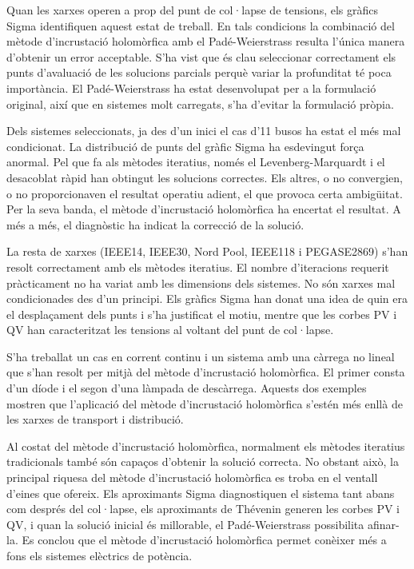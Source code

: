Quan les xarxes operen a prop del punt de col·lapse de tensions, els gràfics Sigma identifiquen aquest estat de treball. En tals condicions la combinació del mètode d'incrustació holomòrfica amb el Padé-Weierstrass resulta l'única manera d'obtenir un error acceptable. S'ha vist que és clau seleccionar correctament els punts d'avaluació de les solucions parcials perquè variar la profunditat té poca importància. El Padé-Weierstrass ha estat desenvolupat per a la formulació original, així que en sistemes molt carregats, s'ha d'evitar la formulació pròpia. 

Dels sistemes seleccionats, ja des d'un inici el cas d'11 busos ha estat el més mal condicionat. La distribució de punts del gràfic Sigma ha esdevingut força anormal. Pel que fa als mètodes iteratius, només el Levenberg-Marquardt i el desacoblat ràpid han obtingut les solucions correctes. Els altres, o no convergien, o no proporcionaven el resultat operatiu adient, el que provoca certa ambigüitat. Per la seva banda, el mètode d'incrustació holomòrfica ha encertat el resultat. A més a més, el diagnòstic ha indicat la correcció de la solució.

La resta de xarxes (IEEE14, IEEE30, Nord Pool, IEEE118 i PEGASE2869) s'han resolt correctament amb els mètodes iteratius. El nombre d'iteracions requerit pràcticament no ha variat amb les dimensions dels sistemes. No són xarxes mal condicionades des d'un principi. Els gràfics Sigma han donat una idea de quin era el desplaçament dels punts i s'ha justificat el motiu, mentre que les corbes PV i QV han caracteritzat les tensions al voltant del punt de col·lapse. 

S'ha treballat un cas en corrent continu i un sistema amb una càrrega no lineal que s'han resolt per mitjà del mètode d'incrustació holomòrfica. El primer consta d'un díode i el segon d'una làmpada de descàrrega. Aquests dos exemples mostren que l'aplicació del mètode d'incrustació holomòrfica s'estén més enllà de les xarxes de transport i distribució.

Al costat del mètode d'incrustació holomòrfica, normalment els mètodes iteratius tradicionals també són capaços d'obtenir la solució correcta. No obstant això, la principal riquesa del mètode d'incrustació holomòrfica es troba en el ventall d'eines que ofereix. Els aproximants Sigma diagnostiquen el sistema tant abans com després del col·lapse, els aproximants de Thévenin generen les corbes PV i QV, i quan la solució inicial és millorable, el Padé-Weierstrass possibilita afinar-la. Es conclou que el mètode d'incrustació holomòrfica permet conèixer més a fons els sistemes elèctrics de potència.


